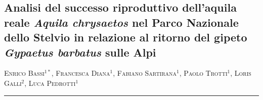 \setcounter{figure}{0}
\setcounter{table}{0}

\begin{adjustwidth}{-3.5cm}{0cm}
\pagestyle{CIOpage}
\chapter*[Successo riproduttivo dell'aquila reale in relazione al ritorno del gipeto]{Analisi del successo riproduttivo dell{\textquoteright}aquila
reale \textbf{\textit{Aquila chrysaetos}}\textbf{ nel Parco Nazionale
dello Stelvio in relazione al ritorno del gipeto
}\textbf{\textit{Gypaetus barbatus}}\textbf{ sulle Alpi}}

\end{adjustwidth}
\begin{adjustwidth}{-3.5cm}{-1cm}
\textsc{Enrico Bassi}$^{1*}$, \textsc{Francesca Diana}$^{1}$, 
\textsc{Fabiano Sartirana}$^{1}$, \textsc{Paolo Trotti}$^{1}$, 
 \textsc{Loris Galli}$^{2}$, \textsc{Luca Pedrotti}$^{1}$\\
 
      
\noindent\color{MUSEBLUE}\rule{27cm}{2pt}
\vspace{1cm}
\end{adjustwidth}



